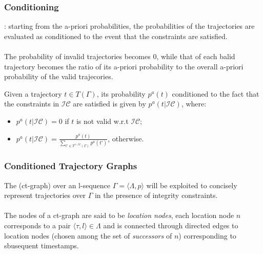 \begin{frame}
\frametitle{Conditioning}

: starting from the a-priori probabilities, the probabilities of the trajectories are evaluated as conditioned to the event that the constraints are satisfied.\\~\\

\textrm{The probability of invalid trajectories becomes 0, while that of each balid trajectory becomes the ratio of its a-priori probability to the overall a-priori probability of the valid trajecories.}

\begin{block}{}
  Given a trajectory $t \in T(\Gamma)$, its probability $p^a(t)$ conditioned to the fact that the constraints in $\mathcal{IC}$ are satisfied is given by $p^a(t|\mathcal{IC})$, where:

  \begin{itemize}
    \item $p^a(t|\mathcal{IC}) = 0$ if $t$ is not valid w.r.t $\mathcal{IC}$;
    \item $p^a(t|\mathcal{IC}) = \frac{p^a(t)}{\sum_{t' \in T^{\models \mathcal{IC}}(\Gamma)} p^a(t')}$, otherwise.
  \end{itemize}

\end{block}

\end{frame}


\begin{frame}
\frametitle{Conditioned Trajectory Graphs}

The  (ct-graph) over an l-sequence $\Gamma = \langle \Lambda,p \rangle$ will be exploited to concisely represent trajectories over $\Gamma$ in the presence of integrity constraints.\\~\\

The nodes of a ct-graph are said to be \emph{location nodes}, each location node $n$ corresponds to a pair $\langle \tau,l \rangle \in \Lambda$ and is connected through directed edges to location nodes (chosen among the set of \emph{successors} of $n$) corresponding to sbusequent timestamps.

\end{frame}


